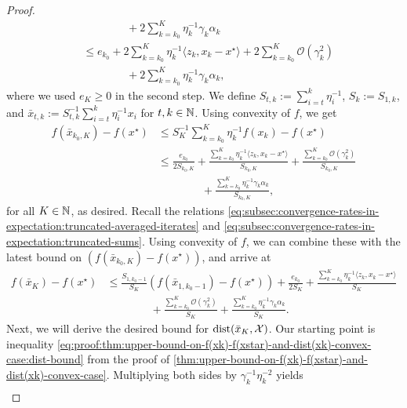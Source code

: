 \begin{proof}
\begin{align*}
        &\phantom{===} + 2\sum_{k=k_0}^{K}\eta_k^{-1}\gamma_k\alpha_k \\
        &\leq
        e_{k_0} + 2\sum_{k=k_0}^K \eta_k^{-1}\langle z_k, x_k - x^\star \rangle + 2\sum_{k=k_0}^{K} \mathcal{O}(\gamma_k^2) \\
        &\phantom{===} + 2\sum_{k=k_0}^{K}\eta_k^{-1}\gamma_k\alpha_k,
    \end{align*}
    where we used $e_K \geq 0$ in the second step.
    We define $S_{t, k} := \sum_{i=t}^{k} \eta_i^{-1}$, $S_k := S_{1, k}$,
    and $\bar{x}_{t, k} := S_{t, k}^{-1} \sum_{i=t}^{k} \eta_i^{-1} x_i$ for $t,k\in\mathbb{N}$.
    Using convexity of $f$, we get
    \begin{align*}
        f(\bar{x}_{k_0,K}) - f(x^\star)
        &\leq
        S_K^{-1}\sum_{k=k_0}^{K} \eta_k^{-1} f(x_{k}) - f(x^\star) \\
        &\leq
        \frac{e_{k_0}}{2S_{k_0, K}} + \frac{\sum_{k=k_0}^K \eta_k^{-1}\langle z_k, x_k - x^\star \rangle}{S_{k_0, K}}
            + \frac{\sum_{k=k_0}^{K} \mathcal{O}(\gamma_k^2)}{S_{k_0, K}} \\
        &\phantom{===} + \frac{\sum_{k=k_0}^{K}\eta_k^{-1}\gamma_k\alpha_k}{S_{k_0, K}},
    \end{align*}
    for all $K\in\mathbb{N}$, as desired.
    Recall the relations \eqref{eq:subsec:convergence-rates-in-expectation:truncated-averaged-iterates} and
    \eqref{eq:subsec:convergence-rates-in-expectation:truncated-sums}.
    Using convexity of $f$, we can combine these with the latest bound on $(f(\bar{x}_{k_0, K}) - f(x^\star))$,
    and arrive at
    \begin{align*}
        f(\bar{x}_K) - f(x^\star)
        &\leq
        \frac{S_{1, k_0-1}}{S_K} (f(\bar{x}_{1, k_0-1}) - f(x^\star))
        +
        \frac{e_{k_0}}{2S_K}
            + \frac{\sum_{k=k_0}^K \eta_k^{-1}\langle z_k, x_k - x^\star \rangle}{S_K} \\
        &\phantom{===} + \frac{\sum_{k=k_0}^{K} \mathcal{O}(\gamma_k^2)}{S_K}
            + \frac{\sum_{k=k_0}^{K}\eta_k^{-1}\gamma_k\alpha_k}{S_K}.
    \end{align*}
    Next, we will derive the desired bound for $\operatorname{dist}(\bar{x}_K, \mathcal{X})$.
    Our starting point is inequality
    \eqref{eq:proof:thm:upper-bound-on-f(xk)-f(xstar)-and-dist(xk)-convex-case:dist-bound}
    from the proof of \cref{thm:upper-bound-on-f(xk)-f(xstar)-and-dist(xk)-convex-case}.
    Multiplying both sides by $\gamma_k^{-1}\eta_k^{-2}$ yields
    \begin{align*}

\end{align*}
\end{proof}
